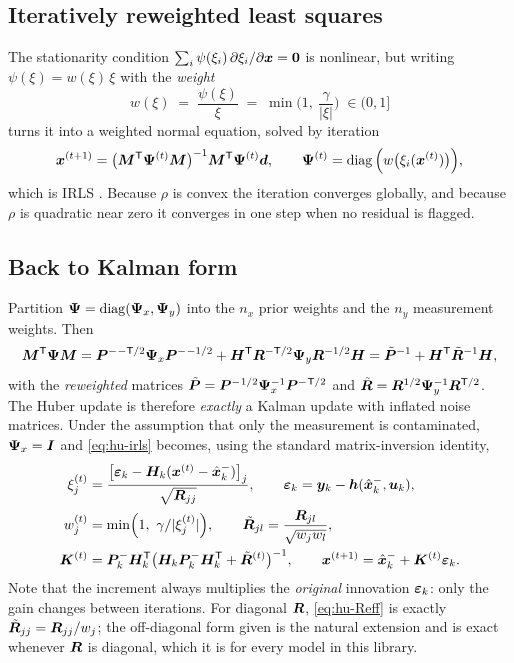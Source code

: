 \subsection{Iteratively reweighted least squares}
The stationarity condition $\sum_i\psi(\xi_i)\,\partial\xi_i/\partial\bm{x}=\bm 0$ is nonlinear, but
writing $\psi(\xi)=w(\xi)\,\xi$ with the \emph{weight}
\begin{equation}
w(\xi)\;=\;\frac{\psi(\xi)}{\xi}\;=\;\min\!\Big(1,\ \frac{\gamma}{|\xi|}\Big)\;\in(0,1]
\label{eq:hu-w}
\end{equation}
turns it into a weighted normal equation, solved by iteration
\begin{equation}
\bm{x}^{(t+1)} = \big(\bm{M}^{\mathsf{T}}\bm\Psi^{(t)}\bm{M}\big)^{-1}\bm{M}^{\mathsf{T}}\bm\Psi^{(t)}\bm{d},
\qquad \bm\Psi^{(t)}=\operatorname{diag}\Big(w\big(\xi_i(\bm{x}^{(t)})\big)\Big),
\label{eq:hu-irls}
\end{equation}
which is IRLS \cite[\S7.8]{huber2009robust}.  Because $\rho$ is convex the iteration converges
globally, and because $\rho$ is quadratic near zero it converges in one step when no residual is
flagged.

\subsection{Back to Kalman form}
Partition $\bm\Psi=\operatorname{diag}(\bm\Psi_x,\bm\Psi_y)$ into the $n_x$ prior weights and the $n_y$
measurement weights.  Then
\begin{equation}
\bm{M}^{\mathsf{T}}\bm\Psi\bm{M}
 = \bm{P}^{-}{}^{-\mathsf{T}/2}\bm\Psi_x\bm{P}^{-}{}^{-1/2}
 + \bm{H}^{\mathsf{T}}\bm{R}^{-\mathsf{T}/2}\bm\Psi_y\bm{R}^{-1/2}\bm{H}
 = \tilde{\bm{P}}^{-1} + \bm{H}^{\mathsf{T}}\tilde{\bm{R}}^{-1}\bm{H},
\label{eq:hu-recast}
\end{equation}
with the \emph{reweighted} matrices
$\tilde{\bm{P}}=\bm{P}^{-}{}^{1/2}\bm\Psi_x^{-1}\bm{P}^{-}{}^{\mathsf{T}/2}$ and
$\tilde{\bm{R}}=\bm{R}^{1/2}\bm\Psi_y^{-1}\bm{R}^{\mathsf{T}/2}$.  The Huber update is therefore \emph{exactly} a
Kalman update with inflated noise matrices.  Under the assumption that only the measurement is
contaminated, $\bm\Psi_x=\bm{I}$ and \eqref{eq:hu-irls} becomes, using the standard
matrix-inversion identity,
\begin{align}
\xi^{(t)}_j &= \frac{\big[\bm{\varepsilon}_k-\bm{H}_k(\bm{x}^{(t)}-\hat{\bm{x}}^{-}_k)\big]_j}{\sqrt{\bm{R}_{jj}}},
  \qquad \bm{\varepsilon}_k=\bm{y}_k-\bm{h}(\hat{\bm{x}}^{-}_k,\bm{u}_k), \label{eq:hu-zeta}\\
w^{(t)}_j &= \min\!\Big(1,\ \gamma/|\xi^{(t)}_j|\Big), \qquad
 \tilde{\bm{R}}_{jl} = \frac{\bm{R}_{jl}}{\sqrt{w_j w_l}}, \label{eq:hu-Reff}\\
\bm{K}^{(t)} &= \bm{P}^{-}_k\bm{H}_k^{\mathsf{T}}\big(\bm{H}_k\bm{P}^{-}_k\bm{H}_k^{\mathsf{T}}+\tilde{\bm{R}}^{(t)}\big)^{-1},
  \qquad \bm{x}^{(t+1)} = \hat{\bm{x}}^{-}_k + \bm{K}^{(t)}\bm{\varepsilon}_k. \label{eq:hu-K}
\end{align}
Note that the increment always multiplies the \emph{original} innovation $\bm{\varepsilon}_k$: only the gain
changes between iterations.  For diagonal $\bm{R}$, \eqref{eq:hu-Reff} is exactly
$\tilde{\bm{R}}_{jj}=\bm{R}_{jj}/w_j$; the off-diagonal form given is the natural extension and is exact
whenever $\bm{R}$ is diagonal, which it is for every model in this library.

